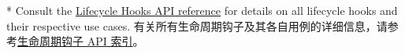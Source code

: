 \begin{paracol}{2}
\switchcolumn[0]*%
Consult the
\href{https://vuejs.org/api/composition-api-lifecycle.html}{Lifecycle
Hooks API reference} for details on all lifecycle hooks and their
respective use cases.
\switchcolumn
有关所有生命周期钩子及其各自用例的详细信息，请参考\href{https://cn.vuejs.org/api/composition-api-lifecycle.html}{生命周期钩子
API 索引}。
\end{paracol}


